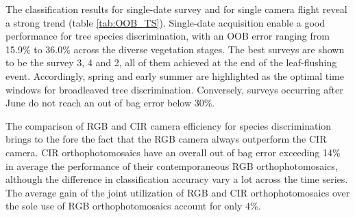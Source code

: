 \documentclass[remotesensing,article,submit,moreauthors,pdftex,12pt,a4paper]{mdpi} %
\begin{document}
The classification results for single-date survey and for single camera flight reveal a strong trend (table \ref{tab:OOB_TS}). 
Single-date acquisition enable a good performance for tree species discrimination, with an OOB error ranging from 15.9\% to 36.0\% across the diverse vegetation stages. 
The best surveys are shown to be the survey 3, 4 and 2, all of them achieved at the end of the leaf-flushing event. 
Accordingly, spring and early summer are highlighted as the optimal time windows for broadleaved tree discrimination. 
Conversely, surveys occurring after June do not reach an out of bag error below 30\%. 

The comparison of RGB and CIR camera efficiency for species discrimination brings to the fore the fact that the RGB camera always outperform the CIR camera. CIR orthophotomosaics have an overall out of bag error exceeding 14\% in average the performance of their contemporaneous RGB orthophotomosaics, although the difference in classification accuracy vary a lot across the time series. 
The average gain of the joint utilization of RGB and CIR orthophotomosaics over the sole use of RGB orthophotomosaics account for only 4\%.
\end{document}
